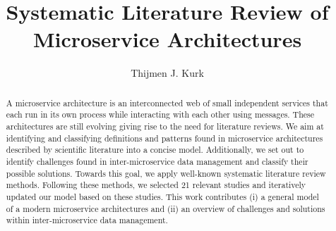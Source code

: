 \documentclass[sigconf,review=false]{acmart}
\newcommand{\todo}[1]{
}
\begin{document}
%
\title{Systematic Literature Review of Microservice Architectures}

%


\author{Thijmen J. Kurk}


%

%
\begin{abstract}
  \todo{The abstract of the study goes here. A good abstract shortly summarizes the paper by covering: (i) a presentation of the topic covered, (ii) the research followed, (iii) the main findings of the study, and (iv) the outcome of the investigation}

  A microservice architecture is an interconnected web of small independent services that each run in its own process while interacting with each other using messages. These architectures are still evolving giving rise to the need for literature reviews. We aim at identifying and classifying definitions and patterns found in microservice architectures described by scientific literature into a concise model. Additionally, we set out to identify challenges found in inter-microservice data management and classify their possible solutions.
  Towards this goal, we apply well-known systematic literature review methods. Following these methods, we selected 21 relevant studies and iteratively updated our model based on these studies.
  This work contributes (i) a general model of a modern microservice architectures and (ii) an overview of challenges and solutions within inter-microservice data management.

\end{abstract}
\end{document}
